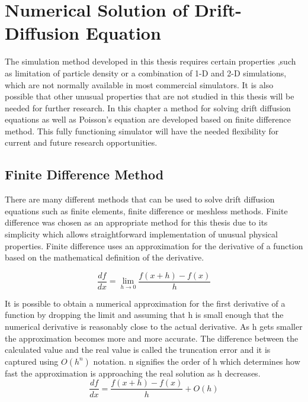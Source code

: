 

\chapter{Numerical Solution of Drift-Diffusion Equation} %

\label{Chapter3} %

\begin{doublespace}


The simulation method developed in this thesis requires certain properties ,such as limitation of particle density or a combination of 1-D and 2-D simulations, which are not normally available in most commercial simulators. It is also possible that other unusual properties that are not studied in this thesis will be needed for further research. In this chapter a method for solving drift diffusion equations as well as Poisson's equation are developed based on finite difference method. This fully functioning simulator will have the needed flexibility for current and future research opportunities.  


\section{Finite Difference Method}
There are many different methods that can be used to solve drift diffusion equations such as finite elements, finite difference or meshless methods. Finite difference was chosen as an appropriate method for this thesis due to its simplicity which allows straightforward implementation of unusual physical properties. Finite difference uses an approximation for the derivative of a function based on the mathematical definition of the derivative\cite{numerical2}.

\begin{equation}
\frac{df}{dx}=\lim\limits_{h \rightarrow 0} \frac{f(x+h)-f(x)}{h}
\end{equation}

It is possible to obtain a numerical approximation for the first derivative of a function by dropping the limit and assuming that h is small enough that the numerical derivative is reasonably close to the actual derivative. As h gets smaller the approximation becomes more and more accurate. The difference between the calculated value and the real value is called the truncation error and it is captured using $O(h^n)$ notation. n signifies the order of h which determines how fast the approximation is approaching the real solution as h decreases\cite{numerical2}.  
\begin{equation}
\frac{df}{dx}=\frac{f(x+h)-f(x)}{h} + O(h)
\label{numdif}
\end{equation}


\end{doublespace}
